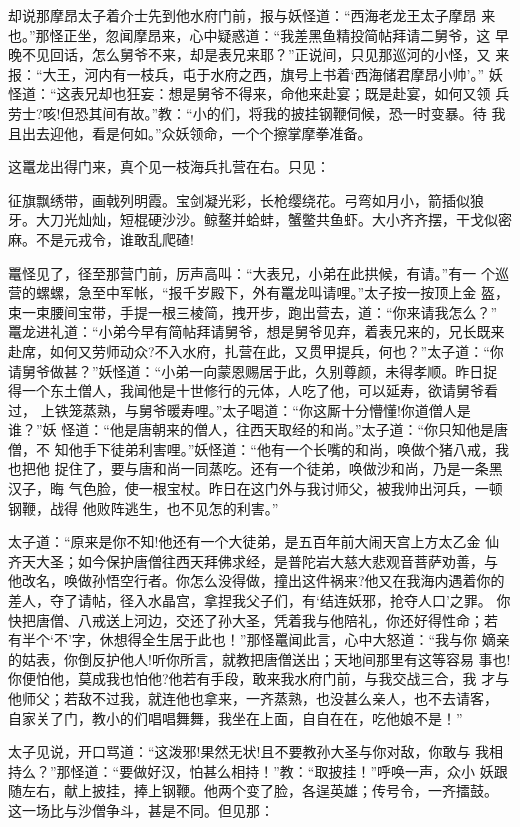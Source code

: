 却说那摩昂太子着介士先到他水府门前，报与妖怪道：“西海老龙王太子摩昂
来也。”那怪正坐，忽闻摩昂来，心中疑惑道：“我差黑鱼精投简帖拜请二舅爷，这
早晚不见回话，怎么舅爷不来，却是表兄来耶？”正说间，只见那巡河的小怪，又
来报：“大王，河内有一枝兵，屯于水府之西，旗号上书着‘西海储君摩昂小帅’。”
妖怪道：“这表兄却也狂妄：想是舅爷不得来，命他来赴宴；既是赴宴，如何又领
兵劳士?咳!但恐其间有故。”教：“小的们，将我的披挂钢鞭伺候，恐一时变暴。待
我且出去迎他，看是何如。”众妖领命，一个个擦掌摩拳准备。

这鼍龙出得门来，真个见一枝海兵扎营在右。只见：

征旗飘绣带，画戟列明霞。宝剑凝光彩，长枪缨绕花。弓弯如月小，箭插似狼
牙。大刀光灿灿，短棍硬沙沙。鲸鳌并蛤蚌，蟹鳖共鱼虾。大小齐齐摆，干戈似密
麻。不是元戎令，谁敢乱爬碴!

鼍怪见了，径至那营门前，厉声高叫：“大表兄，小弟在此拱候，有请。”有一
个巡营的螺螺，急至中军帐，“报千岁殿下，外有鼍龙叫请哩。”太子按一按顶上金
盔，束一束腰间宝带，手提一根三棱简，拽开步，跑出营去，道：“你来请我怎么？”
鼍龙进礼道：“小弟今早有简帖拜请舅爷，想是舅爷见弃，着表兄来的，兄长既来
赴席，如何又劳师动众?不入水府，扎营在此，又贯甲提兵，何也？”太子道：“你
请舅爷做甚？”妖怪道：“小弟一向蒙恩赐居于此，久别尊颜，未得孝顺。昨日捉
得一个东土僧人，我闻他是十世修行的元体，人吃了他，可以延寿，欲请舅爷看过，
上铁笼蒸熟，与舅爷暖寿哩。”太子喝道：“你这厮十分懵懂!你道僧人是谁？”妖
怪道：“他是唐朝来的僧人，往西天取经的和尚。”太子道：“你只知他是唐僧，不
知他手下徒弟利害哩。”妖怪道：“他有一个长嘴的和尚，唤做个猪八戒，我也把他
捉住了，要与唐和尚一同蒸吃。还有一个徒弟，唤做沙和尚，乃是一条黑汉子，晦
气色脸，使一根宝杖。昨日在这门外与我讨师父，被我帅出河兵，一顿钢鞭，战得
他败阵逃生，也不见怎的利害。”

太子道：“原来是你不知!他还有一个大徒弟，是五百年前大闹天宫上方太乙金
仙齐天大圣；如今保护唐僧往西天拜佛求经，是普陀岩大慈大悲观音菩萨劝善，与
他改名，唤做孙悟空行者。你怎么没得做，撞出这件祸来?他又在我海内遇着你的
差人，夺了请帖，径入水晶宫，拿捏我父子们，有‘结连妖邪，抢夺人口’之罪。
你快把唐僧、八戒送上河边，交还了孙大圣，凭着我与他陪礼，你还好得性命；若
有半个‘不’字，休想得全生居于此也！”那怪鼍闻此言，心中大怒道：“我与你
嫡亲的姑表，你倒反护他人!听你所言，就教把唐僧送出；天地间那里有这等容易
事也!你便怕他，莫成我也怕他?他若有手段，敢来我水府门前，与我交战三合，我
才与他师父；若敌不过我，就连他也拿来，一齐蒸熟，也没甚么亲人，也不去请客，
自家关了门，教小的们唱唱舞舞，我坐在上面，自自在在，吃他娘不是！”

太子见说，开口骂道：“这泼邪!果然无状!且不要教孙大圣与你对敌，你敢与
我相持么？”那怪道：“要做好汉，怕甚么相持！”教：“取披挂！”呼唤一声，众小
妖跟随左右，献上披挂，捧上钢鞭。他两个变了脸，各逞英雄；传号令，一齐擂鼓。
这一场比与沙僧争斗，甚是不同。但见那：

